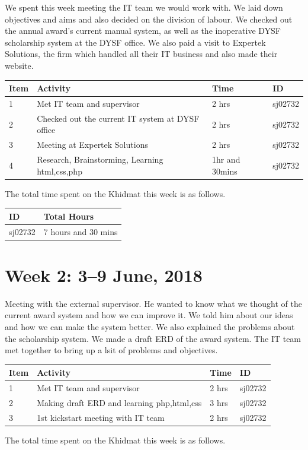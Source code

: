 \documentclass{article}
\begin{document}
We spent this week meeting the IT team we would work with. We laid down objectives and aims and also decided on the division of labour. We checked out the annual award's current manual system, as well as the inoperative DYSF scholarship system at the DYSF office. We also paid a visit to Expertek Solutions, the firm which handled all their IT business and also made their website. \newline

\begin{tabular}{|l|l|l|l|}
  \hline
  Item 	& Activity & Time & ID \\\hline\hline
  1	& Met IT team and supervisor & 2 hrs & sj02732 \\\hline
  2	& Checked out the current IT system at DYSF office & 2 hrs & sj02732 \\\hline
  3	& Meeting at Expertek Solutions & 2 hrs & sj02732 \\\hline
  4 & Research, Brainstorming, Learning html,css,php & 1hr and 30mins & sj02732  \\\hline
\end{tabular}
\newline
The total time spent on the Khidmat this week is as follows.

\begin{tabular}{|l|l|}
  \hline
  ID & Total Hours\\\hline\hline
  sj02732 & 7 hours and 30 mins\\\hline
\end{tabular}

\newpage %
\section*{Week 2: 3--9 June, 2018}

Meeting with the external supervisor. He wanted to know what we thought of the current award system and how we can improve it. We told him about our ideas and how we can make the system better. We also explained the problems about the scholarship system. We made a draft ERD of the award system. The IT team met together to bring up a lsit of problems and objectives. \newline

\begin{tabular}{|l|l|l|l|}
  \hline
  Item 	& Activity & Time & ID \\\hline\hline
  1	& Met IT team and supervisor & 2 hrs & sj02732 \\\hline
  2	& Making draft ERD and learning php,html,css & 3 hrs & sj02732 \\\hline
  3	& 1st kickstart meeting with IT team & 2 hrs & sj02732 \\\hline
\end{tabular}
\newline
The total time spent on the Khidmat this week is as follows.
\end{document}
